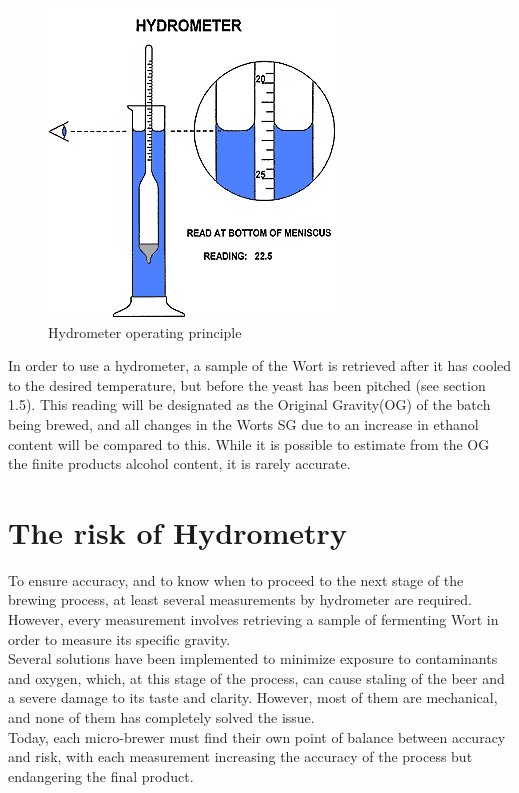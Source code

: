 \documentclass[twoside]{ctuthesis}
\theoremstyle{plain}
\theoremstyle{definition}
\theoremstyle{note}
\begin{document}
\begin{figure}[H]
	\centering
	\includegraphics[scale=0.7]{hydrometer}
	\caption{Hydrometer operating principle \cite{Hydrometer_Pic}}
\end{figure}

In order to use a hydrometer, a sample of the Wort is retrieved after it has cooled to the desired temperature, but before the yeast has been pitched (see section 1.5). This reading will be designated as the Original Gravity(OG) of the batch being brewed, and all changes in the Worts SG due to an increase in ethanol content will be compared to this. While it is possible to estimate from the OG the finite products alcohol content, it is rarely accurate.

\section{The risk of Hydrometry}
To ensure accuracy, and to know when to proceed to the next stage of the brewing process, at least several measurements by hydrometer are required. However, every measurement involves retrieving a sample of fermenting Wort in order to measure its specific gravity.\\
Several solutions have been implemented to minimize exposure to contaminants and oxygen, which, at this stage of the process, can cause staling of the beer and a severe damage to its taste and clarity. However, most of them are mechanical, and none of them has completely solved the issue.\\
Today, each micro-brewer must find their own point of balance between accuracy and risk, with each measurement increasing the accuracy of the process but endangering the final product.
\end{document}
